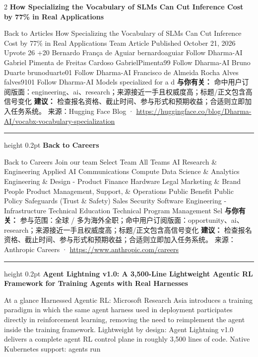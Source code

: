 \documentclass[10.5pt]{ctexart}
\begin{document}
\begin{multicols}{2}
{\large\bfseries How Specializing the Vocabulary of SLMs Can Cut Inference Cost by 77\% in Real Applications}\par
Back to Articles How Specializing the Vocabulary of SLMs Can Cut Inference Cost by 77\% in Real Applications Team Article Published October 21, 2026 Upvote 26 +20 Bernardo França de Aguiar bernardoaguiar Follow Dharma-AI Gabriel Pimenta de Freitas Cardoso GabrielPimenta99 Follow Dharma-AI Bruno Duarte brunoduarte01 Follow Dharma-AI Francisco de Almeida Rocha Alves falves9101 Follow Dharma-AI Models specialized for a d
\textbf{与你有关：} 命中用户订阅版面：engineering、ai、research；来源接近一手且权威度高；标题/正文包含高信号变化
\textbf{建议：} 检查报名资格、截止时间、参与形式和预期收益；合适则立即加入任务系统。
{\footnotesize\color{ormuted} 来源：Hugging Face Blog · \url{https://huggingface.co/blog/Dharma-AI/vocabx-vocabulary-specialization}}
\vspace{2mm}
\hrule height 0.2pt
\vspace{2mm}
{\large\bfseries Back to Careers}\par
Back to Careers Join our team Select Team All Teams AI Research \& Engineering Applied AI Communications Compute Data Science \& Analytics Engineering \& Design - Product Finance Hardware Legal Marketing \& Brand People Product Management, Support, \& Operations Public Benefit Public Policy Safeguards (Trust \& Safety) Sales Security Software Engineering - Infrastructure Technical Education Technical Program Management Sel
\textbf{与你有关：} 参与范围：全球 / 多为海外全职；命中用户订阅版面：opportunity、ai、research；来源接近一手且权威度高；标题/正文包含高信号变化
\textbf{建议：} 检查报名资格、截止时间、参与形式和预期收益；合适则立即加入任务系统。
{\footnotesize\color{ormuted} 来源：Anthropic Careers · \url{https://www.anthropic.com/careers}}
\vspace{2mm}
\hrule height 0.2pt
\vspace{2mm}
{\large\bfseries Agent Lightning v1.0: A 3,500-Line Lightweight Agentic RL Framework for Training Agents with Real Harnesses}\par
At a glance Harnessed Agentic RL: Microsoft Research Asia introduces a training paradigm in which the same agent harness used in deployment participates directly in reinforcement learning, removing the need to reimplement the agent inside the training framework. Lightweight by design: Agent Lightning v1.0 delivers a complete agent RL control plane in roughly 3,500 lines of code. Native Kubernetes support: agents run 

\end{multicols}
\end{document}

